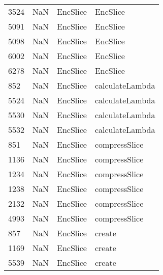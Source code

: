 \begin{tabular}{llll}
3524 &                   NaN &                   EncSlice &                                  EncSlice \\
5091 &                   NaN &                   EncSlice &                                  EncSlice \\
5098 &                   NaN &                   EncSlice &                                  EncSlice \\
6002 &                   NaN &                   EncSlice &                                  EncSlice \\
6278 &                   NaN &                   EncSlice &                                  EncSlice \\
852  &                   NaN &                   EncSlice &                           calculateLambda \\
5524 &                   NaN &                   EncSlice &                           calculateLambda \\
5530 &                   NaN &                   EncSlice &                           calculateLambda \\
5532 &                   NaN &                   EncSlice &                           calculateLambda \\
851  &                   NaN &                   EncSlice &                             compressSlice \\
1136 &                   NaN &                   EncSlice &                             compressSlice \\
1234 &                   NaN &                   EncSlice &                             compressSlice \\
1238 &                   NaN &                   EncSlice &                             compressSlice \\
2132 &                   NaN &                   EncSlice &                             compressSlice \\
4993 &                   NaN &                   EncSlice &                             compressSlice \\
857  &                   NaN &                   EncSlice &                                    create \\
1169 &                   NaN &                   EncSlice &                                    create \\
5539 &                   NaN &                   EncSlice &                                    create \\

\end{tabular}
